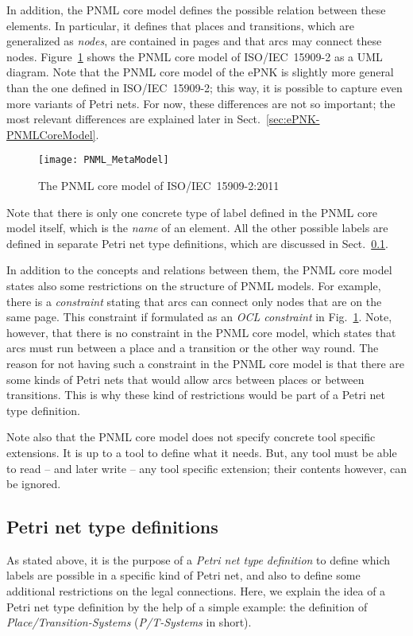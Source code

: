 In addition, the PNML core model defines the possible relation between these
elements. In particular, it defines that places and transitions, which are
generalized as \emph{nodes},%
are contained in pages and that arcs may connect these nodes.
Figure~\ref{fig:MetaModel} shows the PNML core model of ISO/IEC~15909-2 as a UML diagram. Note that the PNML core model of
the ePNK is slightly more general than the one defined in ISO/IEC~15909-2;
this way, it is possible to capture even more variants of Petri nets. For
now, these differences are not so important; the most relevant differences
are explained later in Sect.~\ref{sec:ePNK-PNMLCoreModel}.

\begin{figure}[hbt!!]
  \centerline{\texttt{[image: PNML\_MetaModel]}}
  \caption{The PNML core model of
    ISO/IEC~15909-2:2011 \cite{ISO-IEC:15909-2-2011}}
  \label{fig:MetaModel}%
\end{figure}

Note that there is only one concrete type of label defined in the PNML core
model itself, which is the \emph{name} of an element.%
All the other possible labels are defined in
separate Petri net type definitions, which are discussed in
Sect.~\ref{subsec:PNTD}.

In addition to the concepts and relations between them, the PNML core model
states also some restrictions on the structure of PNML models. For example,
there is a \emph{constraint}%
stating that arcs can connect only nodes that
are on the same page. This constraint if formulated as an \emph{OCL constraint}
in Fig.~\ref{fig:MetaModel}.
Note, however,
that there is no constraint in the PNML core model, which states that arcs must
run between a place and a transition or the other way round. The reason 
for not having such a constraint in the PNML core model is that there are
some kinds of Petri nets that would allow arcs between places or between 
transitions. This is why these kind of restrictions would be part of a
Petri net type definition.

Note also that the PNML core model does not specify concrete tool specific
extensions. It is up to a tool to define what it needs. But, any tool must be
able to read  -- and later write -- any tool specific extension; their contents
however, can be ignored.%

\subsection{Petri net type definitions}
\label{subsec:PNTD}
As stated above, it is the purpose of a  \emph{Petri net type definition} to
define which labels are possible in a specific kind of Petri net, and also
to define some additional restrictions on the legal connections. Here,
we explain the idea of a Petri net type definition by the help of a simple
example: the definition of \emph{Place/Transition-Systems} (\emph{P/T-Systems}
in short).%


